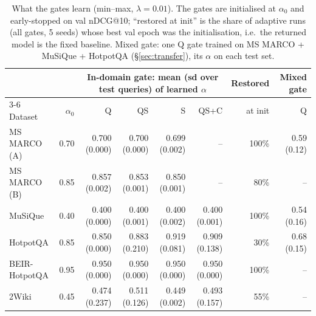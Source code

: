 \begin{table}[t]
\centering\small\setlength{\tabcolsep}{4pt}
\begin{tabular}{lrrrrrrr}
\toprule
 & & \multicolumn{4}{c}{In-domain gate: mean (sd over test queries) of learned $\alpha$} & Restored & Mixed gate \\
\cmidrule(lr){3-6}
Dataset & $\alpha_0$ & \textsc{Q} & \textsc{QS} & \textsc{S} & \textsc{QS+C} & at init & \textsc{Q} \\
\midrule
MS MARCO (A) & 0.70 & 0.700 (0.000) & 0.700 (0.000) & 0.699 (0.002) & -- & 100\% & 0.59 (0.12) \\
MS MARCO (B) & 0.85 & 0.857 (0.002) & 0.853 (0.001) & 0.850 (0.001) & -- & 80\% & -- \\
MuSiQue & 0.40 & 0.400 (0.000) & 0.400 (0.001) & 0.400 (0.002) & 0.400 (0.001) & 100\% & 0.54 (0.16) \\
HotpotQA & 0.85 & 0.850 (0.000) & 0.883 (0.210) & 0.919 (0.081) & 0.909 (0.138) & 30\% & 0.68 (0.15) \\
BEIR-HotpotQA & 0.95 & 0.950 (0.000) & 0.950 (0.000) & 0.950 (0.000) & 0.950 (0.000) & 100\% & -- \\
2Wiki & 0.45 & 0.474 (0.237) & 0.511 (0.126) & 0.449 (0.002) & 0.493 (0.157) & 55\% & -- \\
\bottomrule
\end{tabular}
\caption{What the gates learn (min--max, $\lambda=0.01$). The gates are initialised at $\alpha_0$ and early-stopped on val nDCG@10; ``restored at init'' is the share of adaptive runs (all gates, 5 seeds) whose best val epoch was the initialisation, i.e.\ the returned model is the fixed baseline. Mixed gate: one \textsc{Q} gate trained on MS MARCO + MuSiQue + HotpotQA (\S\ref{sec:transfer}), its $\alpha$ on each test set.}
\label{tab:gate}
\end{table}
